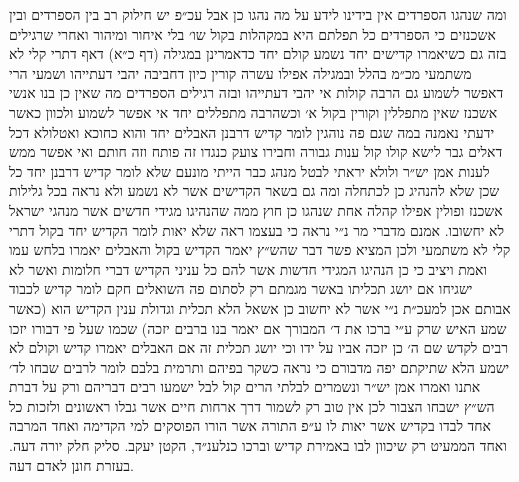 \documentclass[12pt, openany]{book}
\begin{document}
\begin{multicols}{2}
ומה שנהגו הספרדים אין בידינו לידע על מה נהגו כן אבל עכ״פ יש חילוק רב בין הספרדים ובין אשכנזים כי הספרדים כל תפלתם היא במקהלות בקול שו׳ בלי איחור ומיהור ואחרי שרגילים בזה גם כשיאמרו קדישים יחד נשמע קולם יחד כדאמרינן במגילה (דף כ״א) דאף דתרי קלי לא משתמעי מכ״מ בהלל ובמגילה אפילו עשרה קורין כיון דחביבה יהבי דעתייהו ושמעי הרי דאפשר לשמוע גם הרבה קולות אי יהבי דעתייהו ובזה רגילים הספרדים מה שאין כן בנו אנשי אשכנז שאין מתפללין וקורין בקול א׳ וכשהרבה מתפללים יחד אי אפשר לשמוע ולכוון כאשר ידעתי נאמנה במה שגם פה נוהגין לומר קדיש דרבנן האבלים יחד והוא כחוכא ואטלולא דכל דאלים גבר לישא קולו קול ענות גבורה וחבירו צועק כנגדו זה פותח וזה חותם ואי אפשר ממש לענות אמן יש״ר ולולא יראתי לבטל מנהג כבר הייתי מונעם שלא לומר קדיש דרבנן יחד כל שכן שלא להנהיג כן לכתחלה ומה גם בשאר הקדישים אשר לא נשמע ולא נראה בכל גלילות אשכנז ופולין אפילו קהלה אחת שנהגו כן חוץ ממה שהנהיגו מגידי חדשים אשר מנהגי ישראל לא יחשובו. אמנם מדברי מר נ״י נראה כי בעצמו ראה שלא יאות לומר הקדיש יחד בקול דתרי קלי לא משתמעי ולכן המציא פשר דבר שהש״ץ יאמר הקדיש בקול והאבלים יאמרו בלחש עמו ואמת ויציב כי כן הנהיגו המגידי חדשות אשר להם כל עניני הקדיש דברי חלומות ואשר לא ישגיחו אם יושג תכליתו באשר מגמתם רק לסתום פה השואלים חקם לומר קדיש לכבוד אבותם אכן למעכ״ת נ״י אשר לא יחשוב כן אשאל הלא תכלית וגדולת ענין הקדיש הוא (כאשר שמע האיש שרק ע״י ברכו את ד׳ המבורך אם יאמר בנו ברבים יזכה) שכמו שעל פי דבורו יזכו רבים לקדש שם ה׳ כן יזכה אביו על ידו וכי יושג תכלית זה אם האבלים יאמרו קדיש וקולם לא ישמע הלא שתיקתם יפה מדבורם כי נראה כשקר בפיהם ותרמית בלבם לומר לרבים שבחו לד׳ אתנו ואמרו אמן יש״ר ונשמרים לבלתי הרים קול לבל ישמעו רבים דבריהם ורק על דברת הש״ץ ישבחו הצבור לכן אין טוב רק לשמור דרך ארחות חיים אשר גבלו ראשונים ולזכות כל אחד לבדו בקדיש אשר יאות לו ע״פ התורה אשר הורו הפוסקים למי הקדימה ואחד המרבה ואחד הממעיט רק שיכוון לבו באמירת קדיש וברכו כנלענ״ד, הקטן יעקב. סליק חלק יורה דעה. בעזרת חונן לאדם דעה.\\\vspace{0pt}

\end{multicols}\newpage
\end{document}
